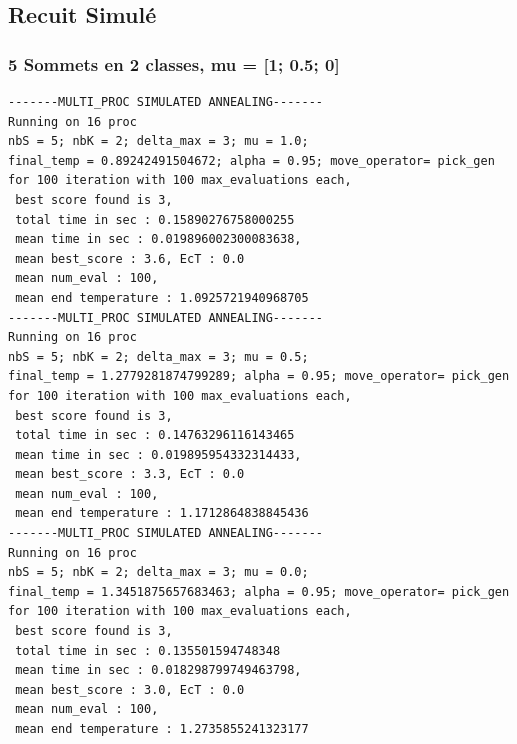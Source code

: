 \documentclass[a4paper]{article}
\begin{document}
\subsection{Recuit Simulé}
\subsubsection{5 Sommets en 2 classes, mu = [1; 0.5; 0]}
\begin{verbatim}
-------MULTI_PROC SIMULATED ANNEALING-------
Running on 16 proc
nbS = 5; nbK = 2; delta_max = 3; mu = 1.0;
final_temp = 0.89242491504672; alpha = 0.95; move_operator= pick_gen
for 100 iteration with 100 max_evaluations each, 
 best score found is 3,
 total time in sec : 0.15890276758000255
 mean time in sec : 0.019896002300083638,
 mean best_score : 3.6, EcT : 0.0
 mean num_eval : 100,
 mean end temperature : 1.0925721940968705
-------MULTI_PROC SIMULATED ANNEALING-------
Running on 16 proc
nbS = 5; nbK = 2; delta_max = 3; mu = 0.5;
final_temp = 1.2779281874799289; alpha = 0.95; move_operator= pick_gen
for 100 iteration with 100 max_evaluations each, 
 best score found is 3,
 total time in sec : 0.14763296116143465
 mean time in sec : 0.019895954332314433,
 mean best_score : 3.3, EcT : 0.0
 mean num_eval : 100,
 mean end temperature : 1.1712864838845436
-------MULTI_PROC SIMULATED ANNEALING-------
Running on 16 proc
nbS = 5; nbK = 2; delta_max = 3; mu = 0.0;
final_temp = 1.3451875657683463; alpha = 0.95; move_operator= pick_gen
for 100 iteration with 100 max_evaluations each, 
 best score found is 3,
 total time in sec : 0.135501594748348
 mean time in sec : 0.018298799749463798,
 mean best_score : 3.0, EcT : 0.0
 mean num_eval : 100,
 mean end temperature : 1.2735855241323177
\end{verbatim}
\end{document}
